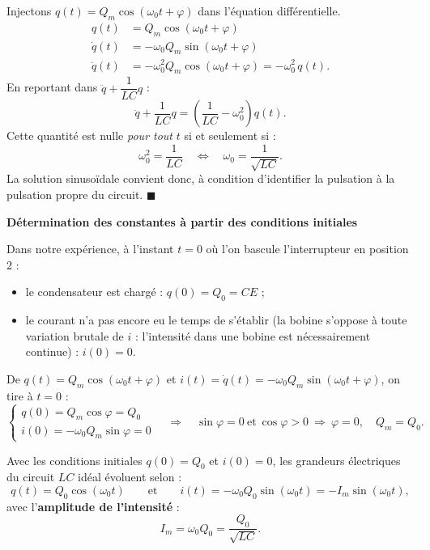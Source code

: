 \documentclass[11pt]{article}
\begin{document}
\begin{experience}
Injectons $q(t) = Q_m\cos(\omega_0 t + \varphi)$ dans l'équation différentielle.
\begin{align*}
q(t) &= Q_m\cos(\omega_0 t + \varphi) \\
\dot{q}(t) &= -\omega_0 Q_m\sin(\omega_0 t + \varphi) \\
\ddot{q}(t) &= -\omega_0^2 Q_m\cos(\omega_0 t + \varphi) = -\omega_0^2\, q(t).
\end{align*}
En reportant dans $\ddot{q} + \dfrac{1}{LC}q$ :
\[ \ddot{q} + \dfrac{1}{LC}q = \left(\dfrac{1}{LC} - \omega_0^2\right) q(t). \]
Cette quantité est nulle \emph{pour tout} $t$ si et seulement si :
\[ \omega_0^2 = \dfrac{1}{LC} \quad \Longleftrightarrow \quad \omega_0 = \dfrac{1}{\sqrt{LC}}. \]
La solution sinusoïdale convient donc, à condition d'identifier la pulsation à la pulsation propre du circuit. $\blacksquare$
\end{experience}

\textbf{Détermination des constantes à partir des conditions initiales}\par

Dans notre expérience, à l'instant $t = 0$ où l'on bascule l'interrupteur en position 2 :
\begin{itemize}
\item le condensateur est chargé : $q(0) = Q_0 = CE$ ;
\item le courant n'a pas encore eu le temps de s'établir (la bobine s'oppose à toute variation brutale de $i$ : l'intensité dans une bobine est nécessairement continue) : $i(0) = 0$.
\end{itemize}

De $q(t) = Q_m\cos(\omega_0 t + \varphi)$ et $i(t) = \dot{q}(t) = -\omega_0 Q_m\sin(\omega_0 t + \varphi)$, on tire à $t = 0$ :
\[
\begin{cases}
q(0) = Q_m\cos\varphi = Q_0 \\
i(0) = -\omega_0 Q_m\sin\varphi = 0
\end{cases}
\quad\Longrightarrow\quad
\sin\varphi = 0 \ \text{et}\ \cos\varphi > 0 \ \Longrightarrow\ \varphi = 0,\quad Q_m = Q_0.
\]

\begin{propriete}
Avec les conditions initiales $q(0) = Q_0$ et $i(0) = 0$, les grandeurs électriques du circuit $LC$ idéal évoluent selon :
\[ q(t) = Q_0\cos(\omega_0 t) \qquad \text{et} \qquad i(t) = -\omega_0 Q_0\sin(\omega_0 t) = -I_m\sin(\omega_0 t), \]
avec l'\textbf{amplitude de l'intensité} :
\[ I_m = \omega_0 Q_0 = \dfrac{Q_0}{\sqrt{LC}}. \]
\end{propriete}
\end{document}
